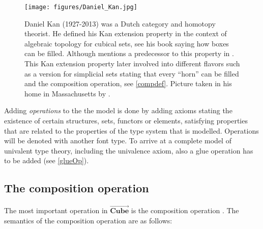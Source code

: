 \documentclass[12pt,a4paper,twoside,xetex]{book} %
\newcommand{\keyword}[1]{\emph{#1}\index{#1}}
\newcommand{\psh}[1]{\overrightarrow{#1}}
\newcommand{\cube}[0]{\textbf{Cube}}
\begin{document}
\begin{figure}
\begin{centering}
\texttt{[image: figures/Daniel\_Kan.jpg]}
\par\end{centering}
\caption{\label{fig:Kan}Daniel Kan (1927-2013) was a Dutch category and homotopy theorist. He defined his Kan extension property  in the context of algebraic 
topology for cubical sets, see his book \cite{Kan1955} saying how boxes can be 
filled. Although \cite{Coquand2019} mentions a predecessor to this property in 
\cite{Eilenberg1939}. This Kan extension property later involved into different 
flavors such as a version for simplicial sets stating that every ``horn'' can 
be filled and the composition operation, see \cref{compdef}. Picture taken in his home in 
Massachusetts by \cite{Kan2005}.}
\end{figure}

Adding \keyword{operations} to the the model is done by adding axioms stating 
the existence of certain structures, sets, functors or elements, satisfying 
properties that are related to the properties of the type system that is 
modelled. Operations will be denoted with another font type. To arrive at a 
complete model of univalent type theory, including the univalence axiom, also a 
glue operation has to be added (see \cref{glueOp}). 

\subsection{The composition operation}

The most important operation in $\psh{\cube}$ is the composition operation 
\cite{Orton2019}. The semantics of the composition operation are as follows:
\end{document}
